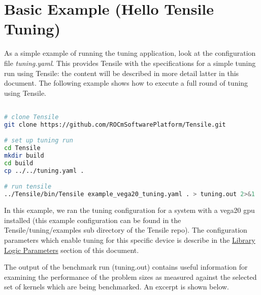 \documentclass[]{article}
\begin{document}
\section{Basic Example (Hello Tensile Tuning)}

As a simple example of running the tuning application, look at the configuration file \emph{tuning.yaml}. This provides Tensile with the specifications for a simple tuning run using Tensile: the content will be described in more detail latter in this document. The following example shows how to execute a full round of tuning using Tensile.

\begin{lstlisting}[language=bash,breaklines=true]

# clone Tensile
git clone https://github.com/ROCmSoftwarePlatform/Tensile.git

# set up tuning run
cd Tensile
mkdir build
cd build
cp ../../tuning.yaml .

# run tensile
../Tensile/bin/Tensile example_vega20_tuning.yaml . > tuning.out 2>&1
\end{lstlisting}

In this example, we ran the tuning configuration for a system with a vega20 gpu installed (this example configuration can be found in the Tensile/tuning/examples sub directory of the Tensile repo). The configuration parameters which enable tuning for this specific device is describe in the  \hyperref[sec:LibraryLogic]{Library  Logic Parameters} section of this document.

The output of the benchmark run (tuning.out) contains useful information for examining the performance of the problem sizes as measured against the selected set of kernels which are being benchmarked. An excerpt is shown below.
\end{document}
